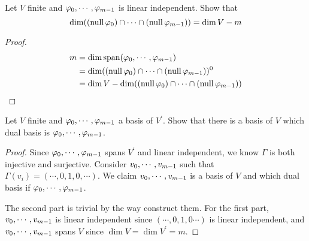 \documentclass[../main.tex]{subfiles}
\begin{document}
\setcounter{exercise}{27}
\begin{exercise}
  Let $V$ finite and $\varphi_0 , \cdots , \varphi_{m - 1}$ is linear independent. Show that
  \[
  \dim ((\operatorname{null} \varphi_0) \cap \cdots \cap (\operatorname{null} \varphi_{m - 1})) = \dim V - m
  \]
\end{exercise}
\begin{proof}
  \begin{align*}
    m & = \dim \operatorname{span}(\varphi_0 , \cdots , \varphi_{m - 1}) \\
      & = \dim ((\operatorname{null} \varphi_0) \cap \cdots \cap (\operatorname{null} \varphi_{m - 1}))^0 \\
      & = \dim V - \dim ((\operatorname{null} \varphi_0) \cap \cdots \cap (\operatorname{null} \varphi_{m - 1}))
  \end{align*}
\end{proof}

\setcounter{exercise}{29}
\begin{exercise}
  Let $V$ finite and $\varphi_0 , \cdots , \varphi_{m - 1}$ a basis of $V^\prime$. Show that
  there is a basis of $V$ which dual basis is $\varphi_0 , \cdots , \varphi_{m - 1}$.
\end{exercise}
\begin{proof}
  Since $\varphi_0 , \cdots , \varphi_{m - 1}$ spans $V^\prime$ and linear independent, we know $\Gamma$
  is both injective and surjective. Consider $v_0 , \cdots , v_{m - 1}$ such that $\Gamma(v_i) = (\cdots, 0, 1, 0, \cdots)$.
  We claim $v_0 , \cdots , v_{m - 1}$ is a basis of $V$ and which dual basis if $\varphi_0 , \cdots , \varphi_{m - 1}$.

  The second part is trivial by the way construct them.
  For the first part, $v_0 , \cdots , v_{m - 1}$ is linear independent since $(\cdots, 0, 1, 0 \cdots)$ is
  linear independent, and $v_0 , \cdots , v_{m - 1}$ spans $V$ since $\dim V = \dim V^\prime = m$.
\end{proof}
\end{document}
